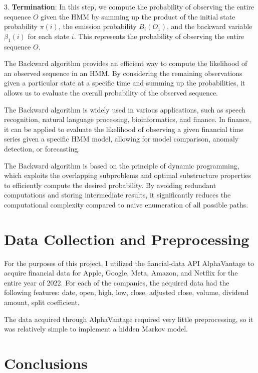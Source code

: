 \documentclass[a4paper,11pt]{article}
\begin{document}
3. \textbf{Termination}: In this step, we compute the probability of observing the entire sequence $O$ given the HMM by summing up the product of the initial state probability $\pi(i)$, the emission probability $B_{i}(O_1)$, and the backward variable $\beta_1(i)$ for each state $i$. This represents the probability of observing the entire sequence $O$.

The Backward algorithm provides an efficient way to compute the likelihood of an observed sequence in an HMM. By considering the remaining observations given a particular state at a specific time and summing up the probabilities, it allows us to evaluate the overall probability of the observed sequence.

The Backward algorithm is widely used in various applications, such as speech recognition, natural language processing, bioinformatics, and finance. In finance, it can be applied to evaluate the likelihood of observing a given financial time series given a specific HMM model, allowing for model comparison, anomaly detection, or forecasting.

The Backward algorithm is based on the principle of dynamic programming, which exploits the overlapping subproblems and optimal substructure properties to efficiently compute the desired probability. By avoiding redundant computations and storing intermediate results, it significantly reduces the computational complexity compared to naive enumeration of all possible paths.

\section{Data Collection and Preprocessing}
\label{sec:data_collection}

For the purposes of this project, I utilized the fiancial-data API AlphaVantage to acquire financial data for Apple, Google, Meta, Amazon, and Netflix for the entire year of 2022. For each of the companies, the acquired data had the following features: date, open, high, low, close, adjusted close, volume, dividend amount, split coefficient.

The data acquired through AlphaVantage required very little preprocessing, so it was relatively simple to implement a hidden Markov model.

\section{Conclusions}
\label{sec:conclusions}
\end{document}
